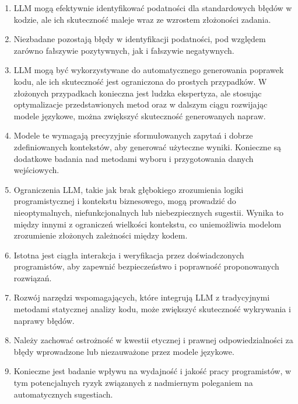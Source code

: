 \begin{enumerate}
    \item LLM mogą efektywnie identyfikować podatności dla standardowych błędów w kodzie, ale ich skuteczność maleje wraz ze wzrostem złożoności zadania.
    \item Niezbadane pozostają błędy w identyfikacji podatności, pod względem zarówno fałszywie pozytywnych, jak i fałszywie negatywnych.
    \item LLM mogą być wykorzystywane do automatycznego generowania poprawek kodu, ale ich skuteczność jest ograniczona do prostych przypadków. W złożonych przypadkach konieczna jest ludzka ekspertyza, ale stosując optymalizacje przedstawionych metod oraz w dalszym ciągu rozwijając modele językowe, można zwiększyć skuteczność generowanych napraw.
    \item Modele te wymagają precyzyjnie sformułowanych zapytań i dobrze zdefiniowanych kontekstów, aby generować użyteczne wyniki. Konieczne są dodatkowe badania nad metodami wyboru i przygotowania danych wejściowych.
    \item Ograniczenia LLM, takie jak brak głębokiego zrozumienia logiki programistycznej i kontekstu biznesowego, mogą prowadzić do nieoptymalnych, niefunkcjonalnych lub niebezpiecznych sugestii. Wynika to między innymi z ograniczeń wielkości kontekstu, co uniemożliwia modelom zrozumienie złożonych zależności między kodem.
    \item Istotna jest ciągła interakcja i weryfikacja przez doświadczonych programistów, aby zapewnić bezpieczeństwo i poprawność proponowanych rozwiązań.
    \item Rozwój narzędzi wspomagających, które integrują LLM z tradycyjnymi metodami statycznej analizy kodu, może zwiększyć skuteczność wykrywania i naprawy błędów.
    \item Należy zachować ostrożność w kwestii etycznej i prawnej odpowiedzialności za błędy wprowadzone lub niezauważone przez modele językowe.
    \item Konieczne jest badanie wpływu na wydajność i jakość pracy programistów, w tym potencjalnych ryzyk związanych z nadmiernym poleganiem na automatycznych sugestiach.
\end{enumerate}
